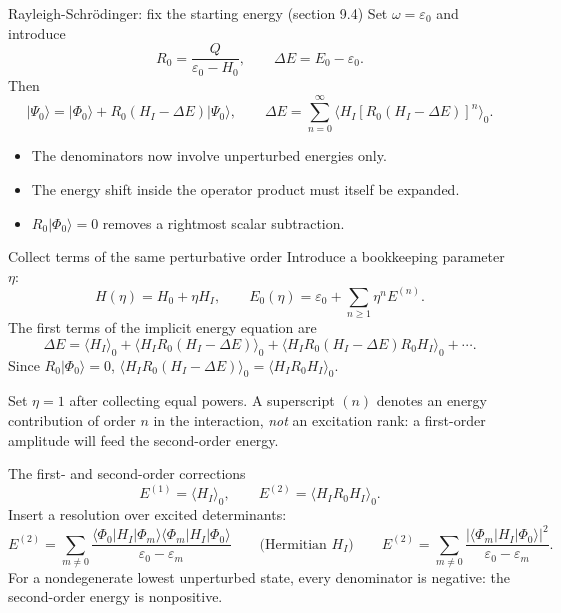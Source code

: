 \documentclass[aspectratio=169,10pt]{beamer}
\newcommand{\warnbox}[1]{%
  \begin{tcolorbox}[colback=palewarm,colframe=warm,title={\bfseries A trap to avoid}]
  #1
  \end{tcolorbox}}
\newcommand{\ket}[1]{\vert #1\rangle}
\newcommand{\mel}[3]{\langle #1\lvert #2\rvert #3\rangle}
\newcommand{\av}[1]{\langle #1\rangle_0}
\newcommand{\ph}{\Phi_0}
\newcommand{\Psizero}{\Psi_0}
\begin{document}
\begin{frame}{Rayleigh-Schr\"odinger: fix the starting energy (section 9.4)}
Set \(\omega=\varepsilon_0\) and introduce
\[
R_0=\frac{Q}{\varepsilon_0-H_0},\qquad
\Delta E=E_0-\varepsilon_0 .
\]
Then
\[
\ket{\Psizero}=\ket{\ph}+R_0(H_I-\Delta E)\ket{\Psizero},
\qquad
\boxed{\Delta E=\sum_{n=0}^{\infty}
\av{H_I\left[R_0(H_I-\Delta E)\right]^n}.}
\]
\begin{itemize}
\item The denominators now involve unperturbed energies only.
\item The energy shift inside the operator product must itself be expanded.
\item \(R_0\ket{\ph}=0\) removes a rightmost scalar subtraction.
\end{itemize}
\end{frame}

\begin{frame}{Collect terms of the same perturbative order}
Introduce a bookkeeping parameter \(\eta\):
\[
H(\eta)=H_0+\eta H_I,\qquad
E_0(\eta)=\varepsilon_0+\sum_{n\ge1}\eta^nE^{(n)}.
\]
The first terms of the implicit energy equation are
\[
\Delta E=\av{H_I}
+\av{H_I R_0(H_I-\Delta E)}
+\av{H_I R_0(H_I-\Delta E)R_0H_I}+\cdots .
\]
Since \(R_0\ket{\ph}=0\),
\(\av{H_I R_0(H_I-\Delta E)}=\av{H_I R_0H_I}\).
\warnbox{Set \(\eta=1\) after collecting equal powers. A superscript \((n)\) denotes an energy contribution of order \(n\) in the interaction, \emph{not} an excitation rank: a first-order amplitude will feed the second-order energy.}
\end{frame}

\begin{frame}{The first- and second-order corrections}
\[
\boxed{E^{(1)}=\av{H_I},\qquad E^{(2)}=\av{H_I R_0H_I}.}
\]
Insert a resolution over excited determinants:
\[
\boxed{E^{(2)}=\sum_{m\ne0}
\frac{\mel{\ph}{H_I}{\Phi_m}\mel{\Phi_m}{H_I}{\ph}}
 {\varepsilon_0-\varepsilon_m}}
\qquad\text{(Hermitian } H_I\text{)}\qquad
E^{(2)}=\sum_{m\ne0}\frac{|\mel{\Phi_m}{H_I}{\ph}|^2}
 {\varepsilon_0-\varepsilon_m}.
\]
\small For a nondegenerate lowest unperturbed state, every denominator is negative: the second-order energy is nonpositive.
\end{frame}
\end{document}
